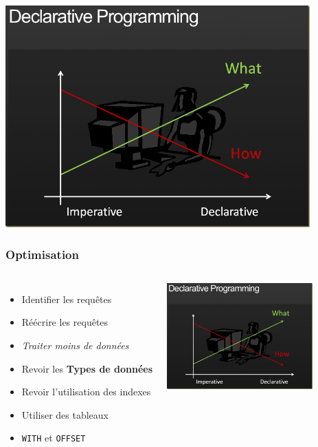 \documentclass{beamer}
\begin{document}
\begin{frame}
  \includegraphics[height=23em]{declarative.png}
\end{frame}

\begin{frame}
  \frametitle{Optimisation}

  \vfill

\begin{columns}[c]
\begin{itemize}
  \item<1-> Identifier les requêtes
  \item<1-> Réécrire les requêtes
  \item<2-> \textit{Traiter moins de données}
  \item<2-> Revoir les \textbf{Types de données}
  \item<2-> Revoir l'utilisation des indexes
  \item<2-> Utiliser des tableaux
  \item<3-> \texttt{WITH} et \texttt{OFFSET}
\end{itemize}

\begin{center}
  \includegraphics[height=11em]{declarative.png}
\end{center}
\end{columns}
\end{frame}
\end{document}
